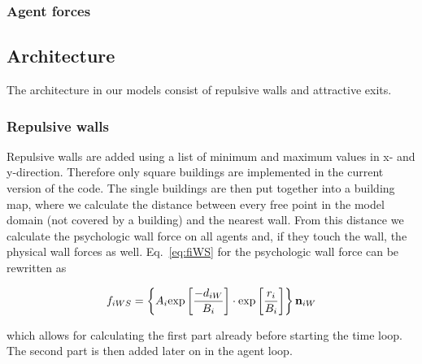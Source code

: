\documentclass[11pt]{article}
\begin{document}
\subsubsection{Agent forces}



\subsection{Architecture}

The architecture in our models consist of repulsive walls and attractive exits.

\subsubsection{Repulsive walls}
\label{sec:WallsImplementation}

Repulsive walls are added using a list of minimum and maximum values in x- and y-direction. Therefore only square buildings are implemented in the current version of the code. The single buildings are then put together into a building map, where we calculate the distance between every free point in the model domain (not covered by a building) and the nearest wall. From this distance we calculate the psychologic wall force on all agents and, if they touch the wall, the physical wall forces as well. Eq.~\eqref{eq:fiWS} for the psychologic wall force can be rewritten as

\begin{equation}
	{f_{iWS}} = \left\{ {{A_i} {\exp \left[ {\frac{{ - {d_{iW}}}}{{{B_i}}}} \right] \cdot \exp \left[ {\frac{{{r_i}}}{{{B_i}}}} \right]} } \right\}{{\bf n}_{iW}}
	\label{eq:fiWS2}
\end{equation}

which allows for calculating the first part already before starting the time loop. The second part is then added later on in the agent loop.
\end{document}
